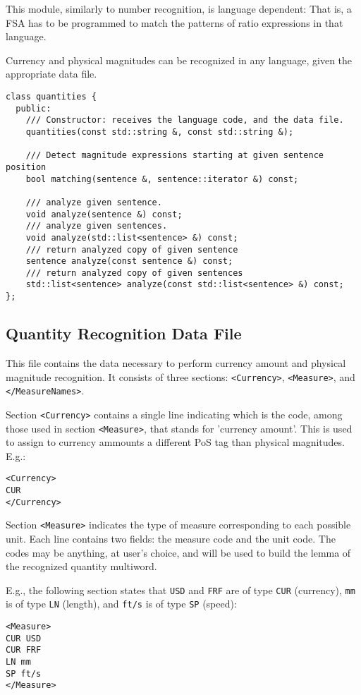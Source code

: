 \documentclass[a4paper]{book}
\begin{document}
   This module, similarly to number recognition, is language
   dependent: That is, a FSA has to be programmed to match the
   patterns of ratio expressions in that language.

   Currency and physical magnitudes can be recognized in any language,
   given the appropriate data file.
\begin{verbatim}
class quantities {
  public:
    /// Constructor: receives the language code, and the data file.
    quantities(const std::string &, const std::string &); 

    /// Detect magnitude expressions starting at given sentence position
    bool matching(sentence &, sentence::iterator &) const;

    /// analyze given sentence.
    void analyze(sentence &) const;
    /// analyze given sentences.
    void analyze(std::list<sentence> &) const;
    /// return analyzed copy of given sentence
    sentence analyze(const sentence &) const;
    /// return analyzed copy of given sentences
    std::list<sentence> analyze(const std::list<sentence> &) const;
};
\end{verbatim}


\subsection {Quantity Recognition Data File}
This file contains the data necessary to perform currency amount and
physical magnitude recognition.  
It consists of three sections:  \verb#<Currency>#, \verb#<Measure>#,
and \verb#</MeasureNames>#.

Section \verb#<Currency># contains a single line indicating which is
the code, among those used in section \verb#<Measure>#, that stands for
 'currency amount'.  This is used to assign to currency ammounts a different
 PoS tag than physical magnitudes.
E.g.:
\begin{verbatim}
<Currency>
CUR
</Currency>
\end{verbatim}

Section \verb#<Measure># indicates the type of measure corresponding
to each possible unit. Each line contains two fields: the measure code
and the unit code. The codes may be anything, at user's choice, and
will be used to build the lemma of the recognized quantity multiword.

E.g., the following section states that {\tt USD} and {\tt FRF} are of
type {\tt CUR} (currency), {\tt mm} is of type {\tt LN} (length), and 
{\tt ft/s} is of type {\tt SP} (speed):
\begin{verbatim}
<Measure>
CUR USD
CUR FRF
LN mm
SP ft/s
</Measure>
\end{verbatim}
\end{document}
